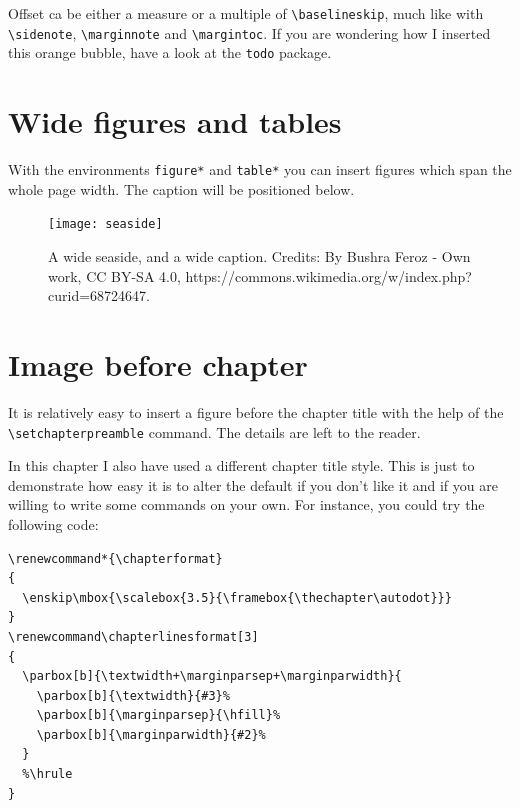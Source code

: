 Offset ca be either a measure or a multiple of \verb|\baselineskip|, 
much like with \verb|\sidenote|, \verb|\marginnote| and 
\verb|\margintoc|. If you are wondering how I 
inserted this orange bubble, have a look at the \verb|todo| package.

\section{Wide figures and tables}

With the environments \verb|figure*| and \verb|table*| you can insert 
figures which span the whole page width. The caption will be positioned 
below.

\begin{figure}[h!]
	\texttt{[image: seaside]}
	\vspace*{-1.3cm}
	\caption[A wide seaside]{A wide seaside, and a wide caption.
		Credits: By Bushra Feroz - Own work, CC BY-SA 4.0, 
		https://commons.wikimedia.org/w/index.php?curid=68724647.
		\blindtext}
\end{figure}

\section{Image before chapter}

It is relatively easy to insert a figure before the chapter title with 
the help of the \verb|\setchapterpreamble| command. The details are left 
to the reader.

In this chapter I also have used a different chapter title style. This 
is just to demonstrate how easy it is to alter the default if you don't 
like it and if you are willing to write some commands on your own. For 
instance, you could try the following code:

\begin{lstlisting}
\renewcommand*{\chapterformat}
{
  \enskip\mbox{\scalebox{3.5}{\framebox{\thechapter\autodot}}}
}
\renewcommand\chapterlinesformat[3]
{
  \parbox[b]{\textwidth+\marginparsep+\marginparwidth}{
	\parbox[b]{\textwidth}{#3}%
	\parbox[b]{\marginparsep}{\hfill}%
	\parbox[b]{\marginparwidth}{#2}%
  }
  %\hrule
}
\end{lstlisting}
